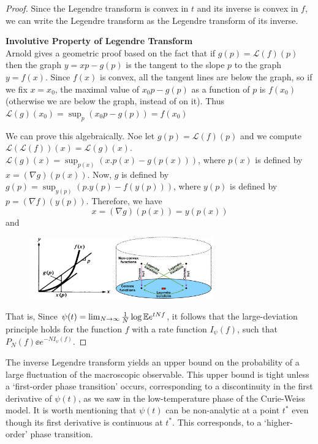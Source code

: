 \documentclass[letterpaper,english,10pt]{article}
\begin{document}
\begin{proof} 
Since the Legendre transform is convex in $t$ and its inverse is convex in $f$, 
we can write the Legendre transform as the Legendre transform of its inverse. 
\begin{shaded*}
\textbf{Involutive Property of Legendre Transform}\\
Arnold gives a geometric proof based on the fact that if $g(p) = \mathcal{L}(f)(p)$ then the graph $y = xp - g(p)$ is the tangent to the slope $p$ to the graph $y = f(x)$. Since $f(x)$ is convex, all the tangent lines are below the graph, so if we fix $x = x_0$, the maximal value of $x_0p-g(p)$ as a function of $p$ is $f(x_0)$ (otherwise we are below the graph, instead of on it).
Thus $\mathcal{L}(g)(x_0) = \sup_{p}(x_0p - g(p)) = f(x_0)$

We can prove this algebraically. Noe let $g(p) = \mathcal{L}(f)(p)$ and we compute $\mathcal{L}(\mathcal{L}(f))(x) = \mathcal{L}(g)(x)$. $\mathcal{L}(g)(x) = \sup_{p(x)}(x.p(x) - g(p(x)))$, where $p(x)$ is defined by $x = (\nabla g)(p(x))$.
Now, $g$ is defined by $g(p) = \sup_{y(p)} (p.y(p) - f(y(p)))$, where $y(p)$ is defined by $p = (\nabla f)(y(p))$.
Therefore, we have
$$x = (\nabla g)(p(x)) = y(p(x))$$
and 
\end{shaded*}
\begin{figure}
    \centering
    \includegraphics[width = 0.7\textwidth]{convex.jpg}
    \label{fig: Legendre Transform of a convex function}
\end{figure}
That is, 
Since $\psi(t) = \lim_{N \to \infty} \frac{1}{N}\log\mathbb{E} e^{tNf}$, it follows that the large-deviation principle holds for the function $f$ with a rate function $I_\psi(f)$, such that $P_N(f) \ee e^{-N I_\psi(f)}$.
\end{proof}
The inverse Legendre transform yields an upper bound on the probability of a large fluctuation of the macroscopic observable. 
This upper bound is tight unless a `first-order phase transition' occurs, corresponding to a discontinuity in the first derivative of $\psi(t)$, as we saw in the low-temperature phase of the Curie-Weiss model.
It is worth mentioning that $\psi(t)$ can be non-analytic at a point $t^\ast$ even though its first derivative is continuous at $t^\ast$. 
This corresponds, to a `higher-order' phase transition. 
\end{document}
